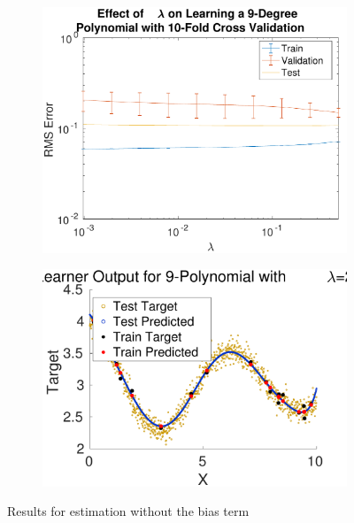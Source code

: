 \documentclass{report}
\begin{document}
\begin{figure}[h]
\centering
\begin{subfigure}[h]{ 0.5\linewidth}
\includegraphics [width=\linewidth ]{lambda_sweep_without_bias}
\end{subfigure}
\begin{subfigure}[h]{ 0.5\linewidth}
\includegraphics [width=\linewidth ]{without_bias_comparison}
\end{subfigure}
\caption{Results for estimation without the bias term}\label{fig:withoutbias}
\end{figure}
\end{document}
